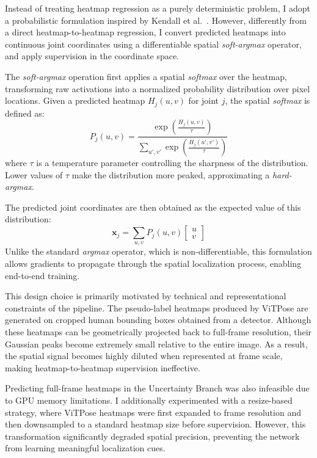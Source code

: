 Instead of treating heatmap regression as a purely deterministic problem, I adopt a probabilistic formulation inspired by Kendall et al.~\cite{kendall2017uncertainties}. However, differently from a direct heatmap-to-heatmap regression, 
I convert predicted heatmaps into continuous joint coordinates using a differentiable spatial \textit{soft-argmax} operator, and apply supervision in the coordinate space.

The \textit{soft-argmax} operation first applies a spatial \textit{softmax} over the heatmap, transforming raw activations into a normalized probability distribution over pixel locations. Given a predicted 
heatmap $H_j(u,v)$ for joint $j$, the spatial \textit{softmax} is defined as:
\begin{equation}
    P_j(u,v) = \frac{\exp\left( \frac{H_j(u,v)}{\tau} \right)} {\sum_{u',v'} \exp\left( \frac{H_j(u',v')}{\tau} \right)}
\end{equation}
where $\tau$ is a temperature parameter controlling the sharpness of the distribution. Lower values of $\tau$ make the distribution more peaked, approximating a \textit{hard-argmax}.

The predicted joint coordinates are then obtained as the expected value of this distribution:
\begin{equation}
\mathbf{x}_j = \sum_{u,v} P_j(u,v)
\begin{bmatrix}
    u \\ v
\end{bmatrix}
\end{equation}
Unlike the standard \textit{argmax} operator, which is non-differentiable, this formulation allows gradients to propagate through the spatial localization process, enabling end-to-end training.

This design choice is primarily motivated by technical and representational constraints of the pipeline. The pseudo-label heatmaps produced by ViTPose \cite{xu2022vitpose} are generated on cropped human bounding boxes obtained from a 
detector. Although these heatmaps can be geometrically projected back to full-frame resolution, their Gaussian peaks become extremely small relative to the entire image. As a result, the spatial signal becomes highly diluted when 
represented at frame scale, making heatmap-to-heatmap supervision ineffective.

Predicting full-frame heatmaps in the Uncertainty Branch was also infeasible due to GPU memory limitations. I additionally experimented with a resize-based strategy, where ViTPose heatmaps were first expanded to frame resolution and 
then downsampled to a standard heatmap size before supervision. However, this transformation significantly degraded spatial precision, preventing the network from learning meaningful localization cues.

